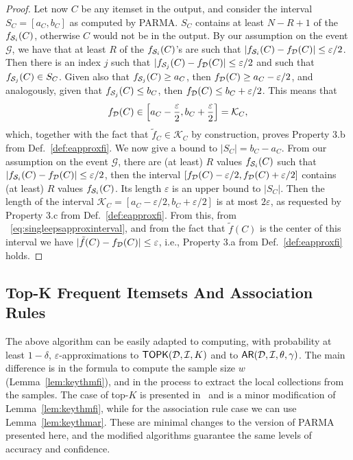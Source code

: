 \begin{proof}
  Let now $C$ be any itemset in the output, and consider the interval
  $S_C=[a_C,b_C]$ as computed by PARMA. $S_C$ contains at least $N-R+1$ of
  the $f_{{\cal S}_i}(C)$, otherwise $C$ would not be in the output. By our
  assumption on the event $\mathcal{G}$, we have
  that at least $R$ of the $f_{{\cal S}_i}(C)$'s are such that
  $|f_{{\cal S}_i}(C)-f_{\cal D}(C)|\le\varepsilon/2$. Then there is an index $j$ such
  that $|f_{{\cal S}_j}(C)-f_{\cal D}(C)|\le\varepsilon/2$ and such that
  $f_{{\cal S}_j}(C)\in S_C$.
  Given also that $f_{{\cal S}_j}(C)\ge a_C$, then $f_{\cal D}(C)\ge
  a_C-\varepsilon/2$, and analogously, given that $f_{{\cal S}_j}(C)\le b_C$, then
  $f_{\cal D}(C)\le b_C+\varepsilon/2$. This means that
  \begin{equation}\label{eq:singleepsapproxinterval}
    f_{\cal D}(C)\in
    \left[a_C-\frac{\varepsilon}{2},
    b_C+\frac{\varepsilon}{2}\right]=\mathcal{K}_C,
  \end{equation}
  which, together with the fact that $\tilde{f}_C\in\mathcal{K}_C$ by
  construction, proves Property 3.b from Def.~\ref{def:eapproxfi}.
  We now give a bound to $|S_C|=b_C-a_C$. From our
  assumption on the event $\mathcal{G}$, there are (at least) $R$ values
  $f_{{\cal S}_i}(C)$ such that $|f_{{\cal S}_i}(C)-f_{\cal D}(C)|\le\varepsilon/2$, then the
  interval $[f_{\cal D}(C)-\varepsilon/2,f_{\cal D}(C)+\varepsilon/2]$ contains (at least)
  $R$ values $f_{{\cal S}_i}(C)$. Its length $\varepsilon$ is an upper bound to
  $|S_C|$. Then the length of the interval
  $\mathcal{K}_C=[a_C-\varepsilon/2,b_C+\varepsilon/2]$ is at most
  $2\varepsilon$, as requested by Property 3.c from
  Def.~\ref{def:eapproxfi}. From this, from ~\eqref{eq:singleepsapproxinterval}, and
  from the fact that $\tilde{f}(C)$ is the center of this interval we have
  $|\tilde{f}(C)-f_{\cal D}(C)|\le\varepsilon$, i.e., Property 3.a from
  Def.~\ref{def:eapproxfi} holds.
\end{proof}

\subsection{Top-K Frequent Itemsets And Association Rules}\label{sec:eapproxtopk}
The above algorithm can be easily adapted to computing, with probability at
least $1-\delta$, $\varepsilon$-approximations to $\mathsf{TOPK}({\cal D},{\cal I},K)$ and to
$\mathsf{AR}({\cal D},{\cal I},\theta,\gamma)$. The main difference is in the formula to compute
the sample size $w$ (Lemma~\ref{lem:keythmfi}), and in the process
to extract the local collections from the samples. The case of top-$K$ is
presented in~\cite{RiondatoU11} and is a minor modification of
Lemma~\ref{lem:keythmfi}, while for the association rule case we can use
Lemma~\ref{lem:keythmar}. These are minimal changes to the version of
PARMA presented here, and the modified algorithms guarantee the same levels of
accuracy and confidence.

